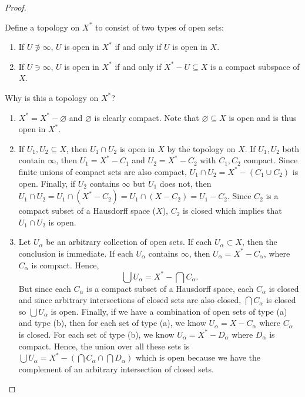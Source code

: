 \documentclass{article}
\theoremstyle{definition}
\begin{document}
\begin{flushleft}
\begin{proof}
\begin{enumerate}
    Define a topology on $X^*$ to consist of two types of open sets:

    \begin{enumerate}
        \item If $U \not\ni \infty$, $U$ is open in $X^*$ if and only if $U$ is open in $X$.
        \item If $U \ni \infty$, $U$ is open in $X^*$ if and only if $X^* - U \subseteq X$ is a compact subspace of $X$.
    \end{enumerate}

    Why is this a topology on $X^*$?

    \begin{enumerate}
        \item $X^* = X^* - \varnothing$ and $\varnothing$ is clearly compact. Note that $\varnothing \subseteq X$ is open and is thus open in $X^*$.
        \item If $U_1, U_2 \subseteq X$, then $U_1 \cap U_2$ is open in $X$ by the topology on $X$. If $U_1, U_2$ both contain $\infty$, then $U_1 = X^* - C_1$ and $U_2 = X^* - C_2$ with $C_1, C_2$ compact. Since finite unions of compact sets are also compact, $U_1 \cap U_2 = X^* - (C_1 \cup C_2)$ is open. Finally, if $U_2$ contains $\infty$ but $U_1$ does not, then $U_1 \cap U_2 = U_1 \cap (X^* - C_2) = U_1 \cap (X - C_2) = U_1 - C_2$. Since $C_2$ is a compact subset of a Hausdorff space ($X$), $C_2$ is closed which implies that $U_1 \cap U_2$ is open.
        \item Let $U_\alpha$ be an arbitrary collection of open sets. If each $U_\alpha \subset X$, then the conclusion is immediate. If each $U_\alpha$ contains $\infty$, then $U_\alpha = X^* - C_\alpha$, where $C_\alpha$ is compact. Hence,
        \[
        \bigcup U_\alpha = X^* - \bigcap C_\alpha.
        \]
        But since each $C_\alpha$ is a compact subset of a Hausdorff space, each $C_\alpha$ is closed and since arbitrary intersections of closed sets are also closed, $\bigcap C_\alpha$ is closed so $\bigcup U_\alpha$ is open. Finally, if we have a combination of open sets of type (a) and type (b), then for each set of type (a), we know $U_\alpha = X - C_\alpha$ where $C_\alpha$ is closed. For each set of type (b), we know $U_\alpha = X^* - D_\alpha$ where $D_\alpha$ is compact. Hence, the union over all these sets is $\bigcup U_\alpha = X^* - \left(\bigcap C_\alpha \cap \bigcap D_\alpha \right)$ which is open because we have the complement of an arbitrary intersection of closed sets.
    \end{enumerate}

\end{enumerate}
\end{proof}
\end{flushleft}
\end{document}
